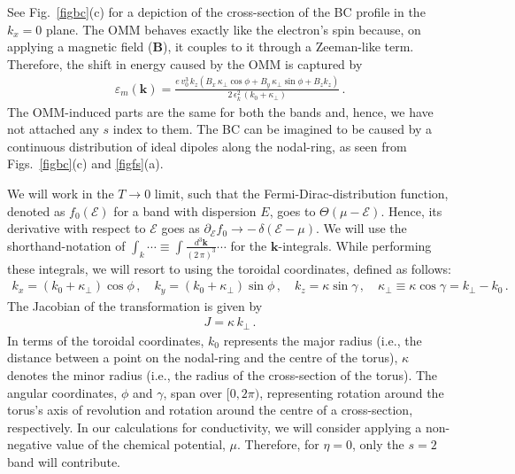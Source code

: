 \documentclass[aps,prb,onecolumn,nofootinbib,citeautoscript,10pt]{revtex4-2}
\newcommand{\bs}[1]{\boldsymbol{#1}}
\begin{document}
See Fig.~\ref{figbc}(c) for a depiction of the cross-section of the BC profile in the $k_x = 0$ plane.
The OMM behaves exactly like the electron's spin because, on applying a magnetic field ($\bs B$), it couples to it through
a Zeeman-like term. Therefore, the shift in energy caused by the OMM is captured by
\begin{align}
\varepsilon_m ({ \bs k}) 
= \frac{e \,v_0^3 \,k_z 
\left( B_x \,\kappa_\perp  \cos \phi + B_y \,\kappa_\perp  \sin \phi 
+ B_z k_z \right)}
{2 \,\epsilon_k^2 \,(k_0 + \kappa_\perp )}\,.
\end{align}
The OMM-induced parts are the same for both the bands and, hence, we have not attached any $s$ index to them.
The BC can be imagined to be caused by a continuous distribution of ideal dipoles along the nodal-ring, as seen from Figs.~\ref{figbc}(c) and \ref{figfs}(a).

We will work in the $T \rightarrow 0 $ limit, such that the Fermi-Dirac-distribution function, denoted as $f_0 (\mathcal E) $ for a band with dispersion $E$, goes to $\Theta (\mu- \mathcal E)$. Hence, its derivative with respect to $\mathcal E$ goes as $\partial_\mathcal E f_0 \rightarrow -\, \delta (\mathcal E - \mu )$. We will use the shorthand-notation of $\int_k \cdots \equiv \int \frac{ d^3 \bs k}{(2\, \pi)^3 }  \cdots $ for the $\bs k$-integrals. While performing these integrals, we will resort to using the toroidal coordinates, defined as follows:
\begin{align}
\label{eqtrsf}
k_x = \left( k_0+ \kappa_\perp\right) \cos \phi  \,, \quad
k_y = \left ( k_0 +  \kappa_\perp \right ) \sin \phi \,,\quad
k_z = \kappa \sin \gamma \,, \quad  \kappa_\perp \equiv \kappa \cos \gamma  = k_\perp - k_0\,.
\end{align}
The Jacobian of the transformation is given by
\begin{align}
J =   \kappa \, k_\perp \,.
\end{align}
In terms of the toroidal coordinates, $k_0$ represents the major radius (i.e., the distance between a point on the nodal-ring and the centre of the torus), $\kappa $ denotes the minor radius (i.e., the radius of the cross-section of the torus). The angular coordinates, $\phi $ and $\gamma $, span over $  [0, 2 \pi)$, representing rotation around the torus's axis of revolution and rotation around the centre of a cross-section, respectively.
In our calculations for conductivity, we will consider applying a non-negative value of the chemical potential, $\mu$. Therefore, for $\eta = 0$, only the $s=2$ band will contribute. 
\end{document}
